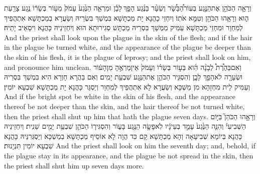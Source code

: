 {וְרָאָ֣ה הַכֹּהֵ֣ן אֶת\maqqaf הַנֶּ֣גַע בְּעֽוֹר\maqqaf הַ֠בָּשָׂ֠ר וְשֵׂעָ֨ר בַּנֶּ֜גַע הָפַ֣ךְ \legarmeh  לָבָ֗ן וּמַרְאֵ֤ה הַנֶּ֙גַע֙ עָמֹק֙ מֵע֣וֹר בְּשָׂר֔וֹ נֶ֥גַע צָרַ֖עַת ה֑וּא וְרָאָ֥הוּ הַכֹּהֵ֖ן וְטִמֵּ֥א אֹתֽוֹ׃}
{וְיִחְזֵי כָהֲנָא יָת מַכְתָּשָׁא בִּמְשַׁךְ בִּשְׂרֵיהּ וְשַׂעֲרָא בְמַכְתָּשָׁא אִתְהֲפֵיךְ לְמִחְוַר וּמִחְזֵי מַכְתָּשָׁא עַמִּיק מִמְּשַׁךְ בִּסְרֵיהּ מַכְתָּשׁ סְגִירוּתָא הוּא וְיִחְזֵינֵיהּ כָּהֲנָא וִיסַאֵיב יָתֵיהּ׃}
{And the priest shall look upon the plague in the skin of the flesh; and if the hair in the plague be turned white, and the appearance of the plague be deeper than the skin of his flesh, it is the plague of leprosy; and the priest shall look on him, and pronounce him unclean.}{}
{וְאִם\maqqaf בַּהֶ֩רֶת֩ לְבָנָ֨ה הִ֜וא בְּע֣וֹר בְּשָׂר֗וֹ וְעָמֹק֙ אֵין\maqqaf מַרְאֶ֣הָ מִן\maqqaf הָע֔וֹר וּשְׂעָרָ֖ה לֹא\maqqaf הָפַ֣ךְ לָבָ֑ן וְהִסְגִּ֧יר הַכֹּהֵ֛ן אֶת\maqqaf הַנֶּ֖גַע שִׁבְעַ֥ת יָמִֽים׃}
{וְאִם בַּהֲרָא חָוְרָא הִיא בִּמְשַׁךְ בִּסְרֵיהּ וְעַמִּיק לֵית מִחְזַהָא מִן מַשְׁכָּא וְשַׂעֲרָא לָא אִתְהֲפֵיךְ לְמִחְוַר וְיַסְגַּר כָּהֲנָא יָת מַכְתָּשָׁא שִׁבְעָא יוֹמִין׃}
{And if the bright spot be white in the skin of his flesh, and the appearance thereof be not deeper than the skin, and the hair thereof be not turned white, then the priest shall shut up him that hath the plague seven days.}{}
{וְרָאָ֣הוּ הַכֹּהֵן֮ בַּיּ֣וֹם הַשְּׁבִיעִי֒ וְהִנֵּ֤ה הַנֶּ֙גַע֙ עָמַ֣ד בְּעֵינָ֔יו לֹֽא\maqqaf פָשָׂ֥ה הַנֶּ֖גַע בָּע֑וֹר וְהִסְגִּיר֧וֹ הַכֹּהֵ֛ן שִׁבְעַ֥ת יָמִ֖ים שֵׁנִֽית׃}
{וְיִחְזֵינֵיהּ כָּהֲנָא בְּיוֹמָא שְׁבִיעָאָה וְהָא מַכְתָּשָׁא קָם כִּד הֲוָה לָא אוֹסֵיף מַכְתָּשָׁא בְמַשְׁכָּא וְיַסְגְּרִנֵּיהּ כָּהֲנָא שִׁבְעָא יוֹמִין תִּנְיָנוּת׃}
{And the priest shall look on him the seventh day; and, behold, if the plague stay in its appearance, and the plague be not spread in the skin, then the priest shall shut him up seven days more.}{}

